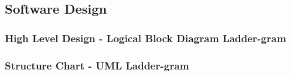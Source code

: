 \documentclass[12pt, a4]{report}
\begin{document}
\subsection{Software Design}
	\subsubsection{High Level Design - Logical Block Diagram \textbar{} Ladder-gram}

	\pagebreak

	\subsubsection{Structure Chart - UML \textbar{} Ladder-gram}
	\paragraph{}

\end{document}
